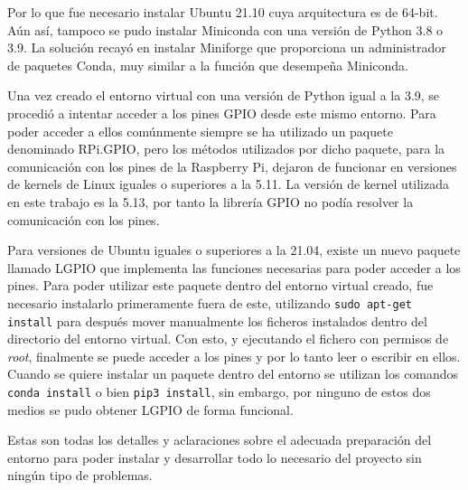\documentclass[a4paper, 12pt]{book}
\begin{document}
Por lo que fue necesario instalar Ubuntu 21.10 cuya arquitectura es de 64-bit. Aún así, tampoco se pudo instalar Miniconda con una versión de Python 3.8 o 3.9. La solución recayó en instalar Miniforge que proporciona un administrador de paquetes Conda, muy similar a la función que desempeña Miniconda.

Una vez creado el entorno virtual con una versión de Python igual a la 3.9, se procedió a intentar acceder a los pines GPIO desde este mismo entorno. Para poder acceder a ellos comúnmente siempre se ha utilizado un paquete denominado RPi.GPIO, pero los métodos utilizados por dicho paquete, para la comunicación con los pines de la Raspberry Pi, dejaron de funcionar en versiones de kernels de Linux iguales o superiores a la 5.11. La versión de kernel utilizada en este trabajo es la 5.13, por tanto la librería GPIO no podía resolver la comunicación con los pines.

Para versiones de Ubuntu iguales o superiores a la 21.04, existe un nuevo paquete llamado LGPIO que implementa las funciones necesarias para poder acceder a los pines. Para poder utilizar este paquete dentro del entorno virtual creado, fue necesario instalarlo primeramente fuera de este, utilizando \texttt{sudo apt-get install} para después mover manualmente los ficheros instalados dentro del directorio del entorno virtual. Con esto, y ejecutando el fichero con permisos de \textit{root}, finalmente se puede acceder a los pines y por lo tanto leer o escribir en ellos.\\
Cuando se quiere instalar un paquete dentro del entorno se utilizan los comandos \texttt{conda install} o bien \texttt{pip3 install}, sin embargo, por ninguno de estos dos medios se pudo obtener LGPIO de forma funcional.

Estas son todas los detalles y aclaraciones sobre el adecuada preparación del entorno para poder instalar y desarrollar todo lo necesario del proyecto sin ningún tipo de problemas.


\glsaddall
\printglossary[type=\acronymtype,nonumberlist]

\printglossary[nonumberlist]

\end{document}

